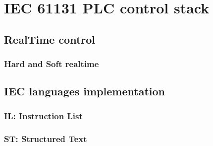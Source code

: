 \part{IEC 61131 PLC control stack}

\chapter{RealTime control}

\section{Hard and Soft realtime}

\chapter{IEC languages implementation}

\section{IL: Instruction List}

\section{ST: Structured Text}
